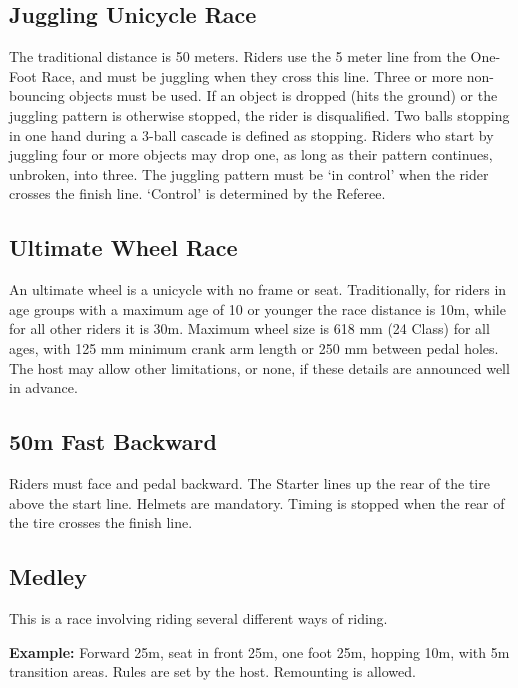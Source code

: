 \subsection{Juggling Unicycle Race}

The traditional distance is 50 meters.
Riders use the 5 meter line from the One-Foot Race, and must be juggling when they cross this line.
Three or more non-bouncing objects must be used.
If an object is dropped (hits the ground) or the juggling pattern is otherwise stopped, the rider is disqualified.
Two balls stopping in one hand during a 3-ball cascade is defined as stopping.
Riders who start by juggling four or more objects may drop one, as long as their pattern continues, unbroken, into three.
The juggling pattern must be `in control' when the rider crosses the finish line.
`Control' is determined by the Referee.

\subsection{Ultimate Wheel Race}

An ultimate wheel is a unicycle with no frame or seat.
Traditionally, for riders in age groups with a maximum age of 10 or younger the race distance is 10m, while for all other riders it is 30m.
Maximum wheel size is 618 mm (24 Class) for all ages, with 125 mm minimum crank arm length or 250 mm between pedal holes.
The host may allow other limitations, or none, if these details are announced well in advance.


\subsection{50m Fast Backward}

Riders must face and pedal backward.
The Starter lines up the rear of the tire above the start line.
Helmets are mandatory.
Timing is stopped when the rear of the tire crosses the finish line.

\subsection{Medley}

This is a race involving riding several different ways of riding.

\textbf{Example:} Forward 25m, seat in front 25m, one foot 25m, hopping 10m, with 5m transition areas.
Rules are set by the host.
Remounting is allowed.

